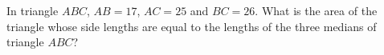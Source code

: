 In triangle $ABC$, $AB=17$, $AC=25$ and $BC=26$. What is the area of the triangle whose side lengths are equal to the lengths of the three medians of triangle $ABC$?
